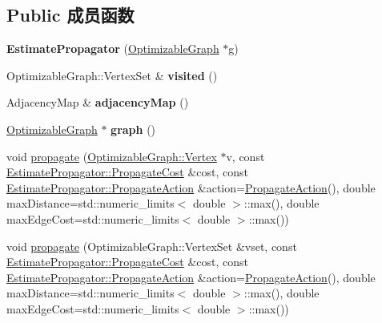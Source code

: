 \subsection*{Public 成员函数}
\begin{DoxyCompactItemize}
\item 
\hypertarget{classg2o_1_1EstimatePropagator_af245037ba41bfb02d531c11f5de4f7e8}{{\bfseries Estimate\-Propagator} (\hyperlink{structg2o_1_1OptimizableGraph}{Optimizable\-Graph} $\ast$g)}\label{classg2o_1_1EstimatePropagator_af245037ba41bfb02d531c11f5de4f7e8}

\item 
\hypertarget{classg2o_1_1EstimatePropagator_a2d346a2411d969caa81817c15052cd58}{Optimizable\-Graph\-::\-Vertex\-Set \& {\bfseries visited} ()}\label{classg2o_1_1EstimatePropagator_a2d346a2411d969caa81817c15052cd58}

\item 
\hypertarget{classg2o_1_1EstimatePropagator_ad6dc3d18c4057915af4cc4986b568855}{Adjacency\-Map \& {\bfseries adjacency\-Map} ()}\label{classg2o_1_1EstimatePropagator_ad6dc3d18c4057915af4cc4986b568855}

\item 
\hypertarget{classg2o_1_1EstimatePropagator_a97064a86789b496b590f4848fdb59bc8}{\hyperlink{structg2o_1_1OptimizableGraph}{Optimizable\-Graph} $\ast$ {\bfseries graph} ()}\label{classg2o_1_1EstimatePropagator_a97064a86789b496b590f4848fdb59bc8}

\item 
void \hyperlink{classg2o_1_1EstimatePropagator_a3b1df65f9b89d81dff33cb140d4f75d4}{propagate} (\hyperlink{classg2o_1_1OptimizableGraph_1_1Vertex}{Optimizable\-Graph\-::\-Vertex} $\ast$v, const \hyperlink{classg2o_1_1EstimatePropagatorCost}{Estimate\-Propagator\-::\-Propagate\-Cost} \&cost, const \hyperlink{structg2o_1_1EstimatePropagator_1_1PropagateAction}{Estimate\-Propagator\-::\-Propagate\-Action} \&action=\hyperlink{structg2o_1_1EstimatePropagator_1_1PropagateAction}{Propagate\-Action}(), double max\-Distance=std\-::numeric\-\_\-limits$<$ double $>$\-::max(), double max\-Edge\-Cost=std\-::numeric\-\_\-limits$<$ double $>$\-::max())
\item 
void \hyperlink{classg2o_1_1EstimatePropagator_ae24b104ec3e8162bc75a70db9941f342}{propagate} (Optimizable\-Graph\-::\-Vertex\-Set \&vset, const \hyperlink{classg2o_1_1EstimatePropagatorCost}{Estimate\-Propagator\-::\-Propagate\-Cost} \&cost, const \hyperlink{structg2o_1_1EstimatePropagator_1_1PropagateAction}{Estimate\-Propagator\-::\-Propagate\-Action} \&action=\hyperlink{structg2o_1_1EstimatePropagator_1_1PropagateAction}{Propagate\-Action}(), double max\-Distance=std\-::numeric\-\_\-limits$<$ double $>$\-::max(), double max\-Edge\-Cost=std\-::numeric\-\_\-limits$<$ double $>$\-::max())
\end{DoxyCompactItemize}

